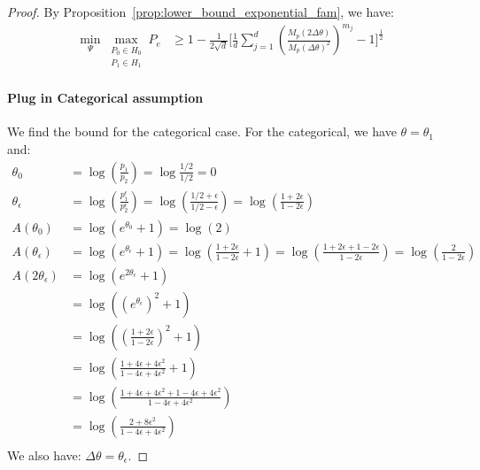 \begin{proof}
    By Proposition~\ref{prop:lower_bound_exponential_fam}, we have:
\begin{align*}
      \min _{\Psi} 
    \max _{\substack{P_0 \in H_0 \\ P_1 \in H_1}}
        P_e 
        &\geq 1 - \frac{1}{2\sqrt{d}} 
        \Bigg[ \frac{1}{d} \sum_{j=1}^d
            \left(\frac{M_p(2\Delta\theta)}{M_p(\Delta \theta)^2}\right)^{m_j}
            -
            1
            \Bigg]^{\frac{1}{2}}
\end{align*}

\paragraph{Plug in Categorical assumption} We find the bound for the categorical case. For the categorical, we have $\theta = \theta_1$ and:
\begin{align*}
\theta_0 
&= \log\left(\frac{p_1}{p_2}\right) 
= \log\frac{1/2}{1/2} = 0\\
\theta_\epsilon 
&= \log\left(\frac{p_1^\epsilon}{p_2^\epsilon}\right) 
= \log\left(\frac{1/2+\epsilon}{1/2-\epsilon}\right)
=\log\left(\frac{1+2\epsilon}{1-2\epsilon}\right)\\
A(\theta_0) &= \log\left(e^{\theta_0} + 1\right) = \log(2)\\
A(\theta_\epsilon) 
&=\log\left(e^{\theta_\epsilon}+1\right)
=\log\left(\frac{1+2\epsilon}{1-2\epsilon}+1\right) 
=\log\left(\frac{1+2\epsilon+1-2\epsilon}{1-2\epsilon}\right) 
=\log\left(\frac{2}{1-2\epsilon}\right) 
\\
A(2\theta_\epsilon) 
&= \log\left(e^{2\theta_\epsilon}+1\right)\\
&=\log\left((e^{\theta_\epsilon})^2+1\right)\\
&=\log\left(\left(\frac{1+2\epsilon}{1-2\epsilon}\right)^2+1\right)\\
&=\log\left(\frac{1+4\epsilon+4\epsilon^2}{1-4\epsilon+4\epsilon^2}+1\right)\\
&=\log\left(\frac{1+4\epsilon+4\epsilon^2+1-4\epsilon+4\epsilon^2}{1-4\epsilon+4\epsilon^2}\right)\\
&=\log\left(\frac{2+8\epsilon^2}{1-4\epsilon+4\epsilon^2}\right)\\
\end{align*}
We also have: $\Delta \theta =\theta_\epsilon$. 


\end{proof}
